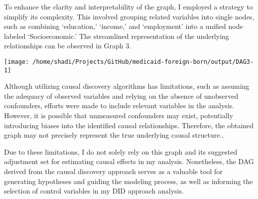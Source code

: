 \documentclass[
]{article}
\begin{document}
To enhance the clarity and interpretability of the graph, I employed a
strategy to simplify its complexity. This involved grouping related
variables into single nodes, such as combining `education,' `income,'
and `employment' into a unified node labeled `Socioeconomic.' The
streamlined representation of the underlying relationships can be
observed in Graph 3.

\begin{center}\texttt{[image: /home/shadi/Projects/GitHub/medicaid-foreign-born/output/DAG3-1]} \end{center}

Although utilizing causal discovery algorithms has limitations, such as
assuming the adequacy of observed variables and relying on the absence
of unobserved confounders, efforts were made to include relevant
variables in the analysis. However, it is possible that unmeasured
confounders may exist, potentially introducing biases into the
identified causal relationships. Therefore, the obtained graph may not
precisely represent the true underlying causal structure..

Due to these limitations, I do not solely rely on this graph and its
suggested adjustment set for estimating causal effects in my analysis.
Nonetheless, the DAG derived from the causal discovery approach serves
as a valuable tool for generating hypotheses and guiding the modeling
process, as well as informing the selection of control variables in my
DID approach analysis.
\end{document}
